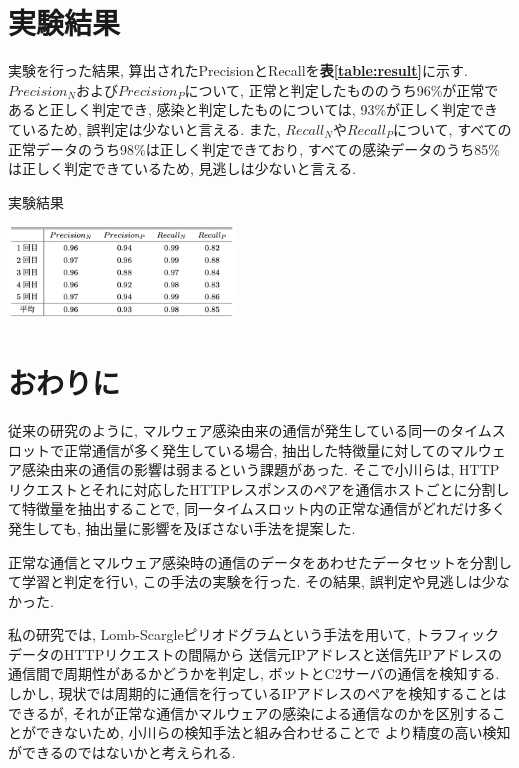 \documentclass[twocolumn,10pt]{ltjsarticle}
\begin{document}
\section{実験結果}
実験を行った結果, 算出されたPrecisionとRecallを\textbf{表\ref{table:result}}に示す. 
$Precision_N$および$Precision_P$について, 正常と判定したもののうち96\%が正常であると正しく判定でき, 
感染と判定したものについては, 93\%が正しく判定できているため, 誤判定は少ないと言える. 
また, $Recall_N$や$Recall_P$について, すべての正常データのうち98\%は正しく判定できており, 
すべての感染データのうち85\%は正しく判定できているため, 見逃しは少ないと言える. 

\begin{table}[htb]
    \caption{実験結果}
    \label{table:result}
    \centering
    \includegraphics[width=6cm]{images/【調査】HTTPリクエスト,レスポンスによるマルウェア検知/result.png}
\end{table}

\section{おわりに}
従来の研究のように, マルウェア感染由来の通信が発生している同一のタイムスロットで正常通信が多く発生している場合, 
抽出した特徴量に対してのマルウェア感染由来の通信の影響は弱まるという課題があった. 
そこで小川らは, HTTPリクエストとそれに対応したHTTPレスポンスのペアを通信ホストごとに分割して特徴量を抽出することで, 
同一タイムスロット内の正常な通信がどれだけ多く発生しても, 抽出量に影響を及ぼさない手法を提案した. \par
正常な通信とマルウェア感染時の通信のデータをあわせたデータセットを分割して学習と判定を行い, この手法の実験を行った. 
その結果, 誤判定や見逃しは少なかった. \par
私の研究では, Lomb-Scargleピリオドグラムという手法を用いて, トラフィックデータのHTTPリクエストの間隔から
送信元IPアドレスと送信先IPアドレスの通信間で周期性があるかどうかを判定し, ボットとC2サーバの通信を検知する. 
しかし, 現状では周期的に通信を行っているIPアドレスのペアを検知することはできるが, 
それが正常な通信かマルウェアの感染による通信なのかを区別することができないため, 小川らの検知手法と組み合わせることで
より精度の高い検知ができるのではないかと考えられる. 




\end{document}
